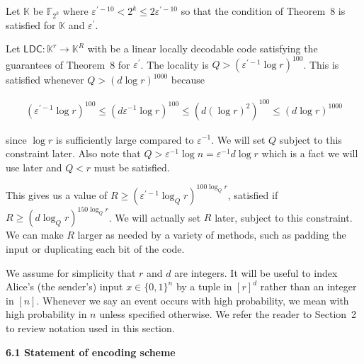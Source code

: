 \documentclass[10pt,a4paper]{article}
\begin{document}
Let $\mathbb{K}$ be $\mathbb{F}_{2^{k}}$ where $\varepsilon^{\prime-10}<2^{k}\leq 2\varepsilon^{\prime-10}$ so that the condition of Theorem 8 is satisfied for $\mathbb{K}$ and $\varepsilon^{\prime}$.\par




Let $\mathsf{LDC}:\mathbb{K}^{r}\to\mathbb{K}^{R}$ with be a linear locally decodable code satisfying the guarantees of Theorem 8 for $\varepsilon^{\prime}$. The locality is $Q>\left(\varepsilon^{\prime-1}\log r\right)^{100}$. This is satisfied whenever $Q>\left(d\log r\right)^{1000}$ because\par


\[\begin{gathered}
\left(\varepsilon^{\prime-1}\log r\right)^{100}\leq\left(d\varepsilon^{-1}\log
r\right)^{100}\leq\left(d(\log r)^{2}\right)^{100}\leq\left(d\log r\right)^{1000}
\end{gathered}\]


since $\log r$ is sufficiently large compared to $\varepsilon^{-1}$.
We will set $Q$ subject to this constraint later. Also note that $Q>\varepsilon^{-1}\log n=\varepsilon^{-1}d\log r$ which is a fact we will use later and $Q<r$ must be satisfied.\par




This gives us a value of $R\geq(\varepsilon^{\prime-1}\log_{Q}r)^{100\log_{Q}r}$, satisfied if $R\geq(d\log_{Q}r)^{150\log_{Q}r}$. We will actually set $R$ later, subject to this constraint. We can make $R$ larger as needed by a variety of methods, such as padding the input or duplicating each bit of the code.\par




We assume for simplicity that $r$ and $d$ are integers. It will be useful to index Alice’s (the sender’s) input $x\in\{0,1\}^{n}$ by a tuple in $[r]^{d}$ rather than an integer in $[n]$. Whenever we say an event occurs with high probability, we mean with high probability in $n$ unless specified otherwise. We refer the reader to Section 2 to review notation used in this section.\par






\par\medskip\noindent\textbf{
6.1 Statement of encoding scheme}\par
\end{document}
